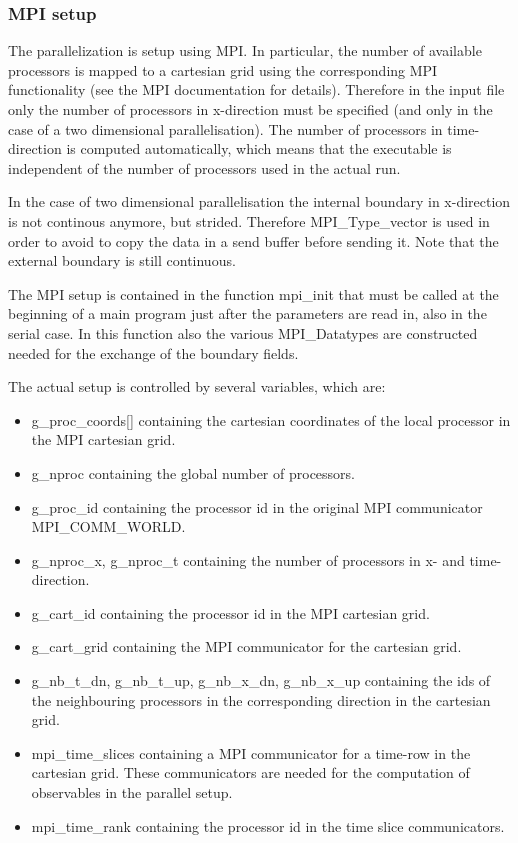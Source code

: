 \subsubsection{MPI setup}

The parallelization is setup using MPI. In particular, the number of
available processors is mapped to a cartesian grid using the
corresponding MPI functionality (see the MPI documentation for
details). Therefore in the input file only the number of processors in
x-direction must be specified (and only in the case of a two
dimensional parallelisation). The number of processors in
time-direction is computed automatically, which means that the
executable is independent of the number of processors used in the
actual run.

In the case of two dimensional parallelisation the internal boundary
in x-direction is not continous anymore, but strided. Therefore
{\ttfamily MPI\_Type\_vector} is used in order to avoid to copy the data
in a send buffer before sending it. Note that the external boundary is
still continuous.

The MPI setup is contained in the function {\ttfamily mpi\_init} that
must be called at the beginning of a main program just after the
parameters are read in, also in the serial case. In this function also
the various {\ttfamily MPI\_Datatype}s are constructed needed for the
exchange of the boundary fields.

The actual setup is controlled by several variables, which are:
\begin{itemize}
\item {\ttfamily g\_proc\_coords[]} containing the cartesian
  coordinates of the local processor in the MPI cartesian grid.
\item {\ttfamily g\_nproc} containing the global number of processors.
\item {\ttfamily g\_proc\_id} containing the processor id in the
  original MPI communicator {\ttfamily MPI\_COMM\_WORLD}.
\item {\ttfamily g\_nproc\_x, g\_nproc\_t} containing the number of
  processors in x- and time-direction.
\item {\ttfamily g\_cart\_id} containing the processor id in the MPI
  cartesian grid.
\item {\ttfamily g\_cart\_grid} containing the MPI communicator for
  the cartesian grid.
\item {\ttfamily g\_nb\_t\_dn}, {\ttfamily g\_nb\_t\_up}, {\ttfamily g\_nb\_x\_dn},
  {\ttfamily g\_nb\_x\_up} containing the ids of the neighbouring
  processors in the corresponding direction in the cartesian grid.
\item {\ttfamily mpi\_time\_slices} containing a MPI communicator
  for a time-row in the cartesian grid. These communicators are needed
  for the computation of observables in the parallel setup.
\item {\ttfamily mpi\_time\_rank} containing the processor id in the
  time slice communicators.
\end{itemize}

